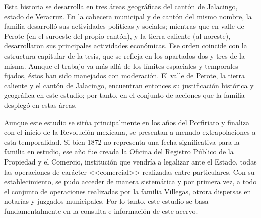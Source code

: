 \documentclass[14pt,twoside,final]{extbook} %
\begin{document}
Esta historia se desarrolla en tres áreas geográficas del cantón de Jalacingo, estado de Veracruz. En la cabecera municipal y de cantón del mismo nombre, la familia desarrolló sus actividades políticas y sociales; mientras que en valle de Perote (en el suroeste del propio cantón), y la tierra caliente (al noreste), desarrollaron sus principales actividades económicas. Ese orden coincide con la estructura capitular de la tesis, que se refleja en los apartados dos y tres de la misma. Aunque el trabajo va más allá de los límites espaciales y temporales fijados, éstos han sido manejados con moderación. El valle de Perote, la tierra caliente y el cantón de Jalacingo, encuentran entonces su justificación histórica y geográfica en este estudio; por tanto, en el conjunto de acciones que la familia desplegó en estas áreas.

Aunque este estudio se sitúa principalmente en los años del Porfiriato y finaliza con el inicio de la Revolución mexicana, se presentan a menudo extrapolaciones a esta temporalidad. Si bien 1872 no representa una fecha significativa para la familia en estudio, ese año fue creada la Oficina del Registro Público de la Propiedad y el Comercio, institución que vendría a legalizar ante el Estado, todas las operaciones de carácter <<comercial>> realizadas entre particulares. Con su establecimiento, se pudo acceder de manera sistemática y por primera vez, a todo el conjunto de operaciones realizadas por la familia Villegas, otrora dispersas en notarías y juzgados municipales. Por lo tanto, este estudio se basa fundamentalmente en la consulta e información de este acervo.
\end{document}
